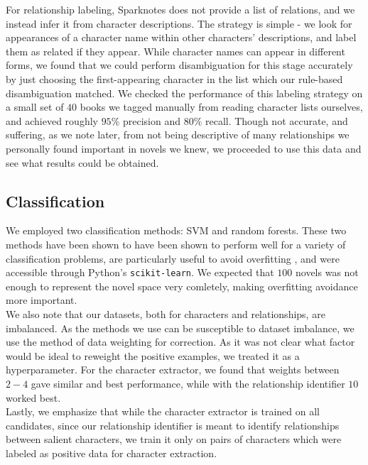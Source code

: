 \documentclass[12pt]{article}
\begin{document}
        For relationship labeling, Sparknotes does not provide a list of relations, and we instead
        infer it from character descriptions. The strategy is simple - we look for appearances
        of a character name within other characters' descriptions, and label them as related if
        they appear. While character names can appear in different forms, we found that we could
        perform disambiguation for this stage accurately by just choosing the first-appearing 
        character in the list which our rule-based disambiguation matched. We checked the performance
        of this labeling strategy on a small set of $40$ books we tagged manually from reading 
        character lists ourselves, and achieved roughly $95\%$ precision and $80\%$ recall. Though not
        accurate, and suffering, as we note later, from not being descriptive of many relationships
        we personally found important in novels we knew, we proceeded to use this data and 
        see what results could be obtained.

    \subsection{Classification}

        We employed two classification methods: SVM and random forests. These
        two methods have been shown to have been shown to perform well for a variety of
        classification problems, are particularly useful to avoid overfitting \cite{hearst1998support,breiman2001random},
        and were accessible through Python's \texttt{scikit-learn}.
        We expected that $100$ novels was not enough to represent the novel space very comletely,
        making overfitting avoidance more important. \\

        We also note that our datasets, both for characters and relationships, are imbalanced.
        As the methods we use can be susceptible to dataset imbalance, we use the method of
        data weighting for correction. As it was not clear what factor would be ideal to 
        reweight the positive examples, we treated it as a hyperparameter. For the character
        extractor, we found that weights between $2-4$ gave similar and best performance,
        while with the relationship identifier $10$ worked best. \\

        Lastly, we emphasize that while the character extractor is trained on all candidates,
        since our relationship identifier is meant to identify relationships between salient
        characters, we train it only on pairs of characters which were labeled as positive
        data for character extraction.
\end{document}
